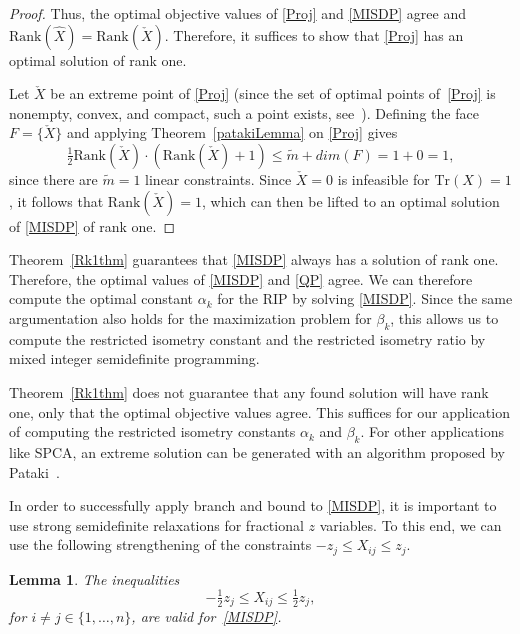\documentclass[journal]{IEEEtran}
\newtheorem{lemma}[theorem]{Lemma}
\newcommand{\Tr}{\text{Tr}}
\newcommand{\Rk}{\text{Rank}}
\begin{document}
\begin{proof}
  Thus, the optimal objective values of \eqref{Proj} and \eqref{MISDP}
  agree and $\Rk(\hat{X}) = \Rk(\check{X})$.  Therefore, it
  suffices to show that \eqref{Proj} has an optimal solution of rank one.

  Let $\check{X}$ be an extreme point of \eqref{Proj} (since the set of
  optimal points of~\eqref{Proj} is nonempty, convex, and compact, such a
  point exists, see~\cite[Corollary 18.5.1]{Roc70}). Defining the face $F =
  \{\check{X}\}$ and applying Theorem~\ref{patakiLemma} on \eqref{Proj}
  gives
  \begin{equation*}
    \tfrac{1}{2} \Rk(\check{X}) \cdot (\Rk(\check{X})+1) \leq \tilde{m} + dim(F) = 1 + 0 = 1,
  \end{equation*}
  since there are $\tilde{m} = 1$ linear constraints. Since $\check{X} = 0$
  is infeasible for $\Tr(X) = 1$, it follows that $\Rk(\check{X}) = 1$,
  which can then be lifted to an optimal solution of \eqref{MISDP} of rank
  one.
\end{proof}

Theorem~\ref{Rk1thm} guarantees that \eqref{MISDP} always has a solution of
rank one. Therefore, the optimal values of \eqref{MISDP} and \eqref{QP}
agree. We can therefore compute the optimal constant $\alpha_k$ for the RIP
by solving \eqref{MISDP}. Since the same argumentation also holds for the
maximization problem for $\beta_k$, this allows us to compute the
restricted isometry constant and the restricted isometry ratio by
mixed integer semidefinite programming.

Theorem~\ref{Rk1thm} does not guarantee that any
found solution will have rank one, only that the optimal objective
values agree. This suffices for our application of
computing the restricted isometry constants $\alpha_k$ and $\beta_k$. For other
applications like SPCA, an extreme solution can be generated with an
algorithm proposed by Pataki~\cite{coneLP}.

In order to successfully apply branch and bound to \eqref{MISDP}, it is
important to use strong semidefinite relaxations for fractional $z$
variables. To this end, we can use the following strengthening of the
constraints $-z_j \leq X_{ij} \leq z_j$.

\begin{lemma}\label{HalfConstraint} 
  The inequalities
  \begin{equation}\label{eq:HalfConstraint}
    -\tfrac{1}{2} z_j \leq X_{ij} \leq \tfrac{1}{2} z_j,
  \end{equation}
  for $i \neq j \in \{1, \dots, n\}$, are valid for~\eqref{MISDP}.
\end{lemma}
\end{document}
